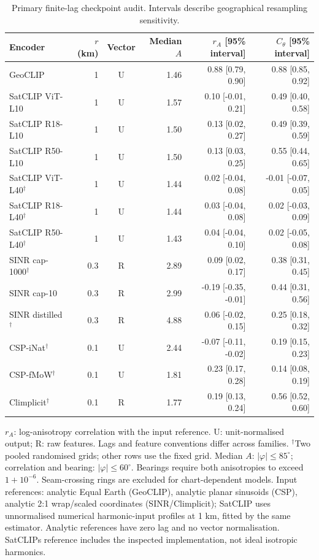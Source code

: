 \begin{table}[htbp]\centering\small
\caption{Primary finite-lag checkpoint audit. Intervals describe geographical resampling sensitivity.}
\label{tab:enc}
\begin{tabular}{@{}lrcrrr@{}}
\toprule
Encoder & $r$ (km)&Vector&Median $A$ & $r_A$ [95\% interval] & $C_\theta$ [95\% interval]\\\midrule
GeoCLIP&1&U&1.46&0.88 [0.79, 0.90]&0.88 [0.85, 0.92]\\
SatCLIP ViT-L10&1&U&1.57&0.10 [-0.01, 0.21]&0.49 [0.40, 0.58]\\
SatCLIP R18-L10&1&U&1.50&0.13 [0.02, 0.27]&0.49 [0.39, 0.59]\\
SatCLIP R50-L10&1&U&1.50&0.13 [0.03, 0.25]&0.55 [0.44, 0.65]\\
SatCLIP ViT-L40$^\dagger$&1&U&1.44&0.02 [-0.04, 0.08]&-0.01 [-0.07, 0.05]\\
SatCLIP R18-L40$^\dagger$&1&U&1.44&0.03 [-0.04, 0.08]&0.02 [-0.03, 0.09]\\
SatCLIP R50-L40$^\dagger$&1&U&1.43&0.04 [-0.04, 0.10]&0.02 [-0.05, 0.08]\\
SINR cap-1000$^\dagger$&0.3&R&2.89&0.09 [0.02, 0.17]&0.38 [0.31, 0.45]\\
SINR cap-10&0.3&R&2.99&-0.19 [-0.35, -0.01]&0.44 [0.31, 0.56]\\
SINR distilled$^\dagger$&0.3&R&4.88&0.06 [-0.02, 0.15]&0.25 [0.18, 0.32]\\
CSP-iNat$^\dagger$&0.1&U&2.44&-0.07 [-0.11, -0.02]&0.19 [0.15, 0.23]\\
CSP-fMoW$^\dagger$&0.1&U&1.81&0.23 [0.17, 0.28]&0.14 [0.08, 0.19]\\
Climplicit$^\dagger$&0.1&R&1.77&0.19 [0.13, 0.24]&0.56 [0.52, 0.60]\\
\bottomrule\end{tabular}
\par\smallskip\parbox{.97\textwidth}{\footnotesize $r_A$: log-anisotropy correlation with the input reference. U: unit-normalised output; R: raw features. Lags and feature conventions differ across families. $^\dagger$Two pooled randomised grids; other rows use the fixed grid. Median $A$: $|\varphi|\le85^\circ$; correlation and bearing: $|\varphi|\le60^\circ$. Bearings require both anisotropies to exceed $1+10^{-6}$. Seam-crossing rings are excluded for chart-dependent models. Input references: analytic Equal Earth (GeoCLIP), analytic planar sinusoids (CSP), analytic 2:1 wrap/scaled coordinates (SINR/Climplicit); SatCLIP uses unnormalised numerical harmonic-input profiles at 1 km, fitted by the same estimator. Analytic references have zero lag and no vector normalisation. SatCLIP\textquotesingle s reference includes the inspected implementation, not ideal isotropic harmonics.}
\end{table}
